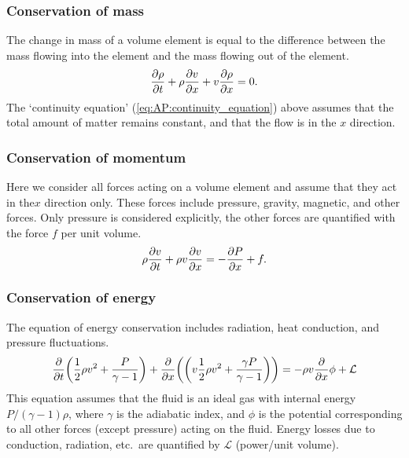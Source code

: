 \subsubsection{Conservation of mass}
The change in mass of a volume element is equal to the difference between the mass flowing into the element and the mass flowing out of the element.
%
\begin{equation}
	\pdv{\rho}{t} + \rho \pdv{v}{x} + v \pdv{\rho}{x} = 0.
	\label{eq:AP:continuity_equation}
\end{equation}
%
The `continuity equation' (\ref{eq:AP:continuity_equation}) above assumes that the total amount of matter remains constant, and that the flow is in the \(x\) direction.
%
\subsubsection{Conservation of momentum}
Here we consider all forces acting on a volume element and assume that they act in the\(x\) direction only.
 These forces include pressure, gravity, magnetic, and other forces.
 Only pressure is considered explicitly, the other forces are quantified with the force \(f\) per unit volume.
%
\begin{equation}
	\rho \pdv{v}{t} + \rho v \pdv{v}{x} = -\pdv{P}{x} + f.
	\label{eq:AP:momentum_conservation}
\end{equation}
%
\subsubsection{Conservation of energy}
The equation of energy conservation includes radiation, heat conduction, and pressure fluctuations.
%
\begin{equation}
	\pdv{t}(\frac{1}{2}\rho v^2 + \frac{P}{\gamma - 1}) + \pdv{x}(\left(v\frac{1}{2}\rho v^2 + \frac{\gamma P}{\gamma - 1}\right)) = -\rho v \pdv{x}\phi + \mathcal{L}
	\label{eq:AP:energy_conservation} %
\end{equation}
%
This equation assumes that the fluid is an ideal gas with internal energy \(P/(\gamma -1)\rho\), where \(\gamma\) is the adiabatic index, and \(\phi\) is the potential corresponding to all other forces (except pressure) acting on the fluid.
 Energy losses due to conduction, radiation, etc.\ are quantified by \(\mathcal{L}\) (power/unit volume).
%
